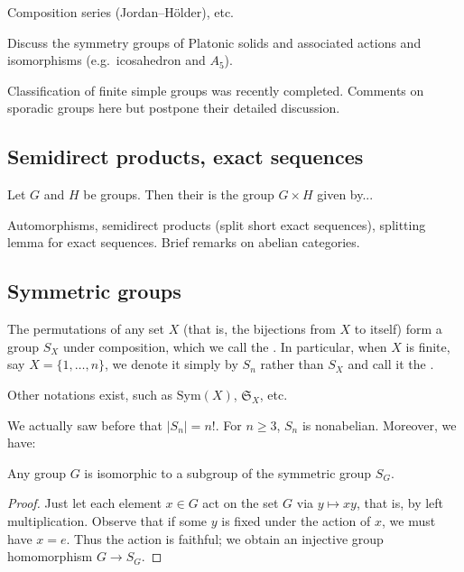 Composition series (Jordan--H\"older), etc.

Discuss the symmetry groups of Platonic solids and associated actions and isomorphisms (e.g.\ icosahedron and $A_5$).

\begin{remark}
Classification of finite simple groups was recently completed. Comments on sporadic groups here but postpone their detailed discussion.
\end{remark}

\subsection{Semidirect products, exact sequences}

\begin{definition}
Let $G$ and $H$ be groups. Then their  is the group $G \times H$ given by...
\end{definition}

Automorphisms, semidirect products (split short exact sequences), splitting lemma for exact sequences. Brief remarks on abelian categories.

\subsection{Symmetric groups}

The permutations of any set $X$ (that is, the bijections from $X$ to itself) form a group $S_X$ under composition, which we call the . In particular, when $X$ is finite, say $X = \{ 1, \ldots, n \}$, we denote it simply by $S_n$ rather than $S_X$ and call it the .

Other notations exist, such as $\mathrm{Sym}(X)$, $\mathfrak{S}_X$, etc. 

We actually saw before that $|S_n| = n!$. For $n \geq 3$, $S_n$ is nonabelian. Moreover, we have:

\begin{theorem}[Cayley]
Any group $G$ is isomorphic to a subgroup of the symmetric group $S_G$.
\end{theorem}

\begin{proof}
Just let each element $x \in G$ act on the set $G$ via $y \mapsto xy$, that is, by left multiplication. Observe that if some $y$ is fixed under the action of $x$, we must have $x=e$. Thus the action is faithful; we obtain an injective group homomorphism $G \to S_G$.
\end{proof}

